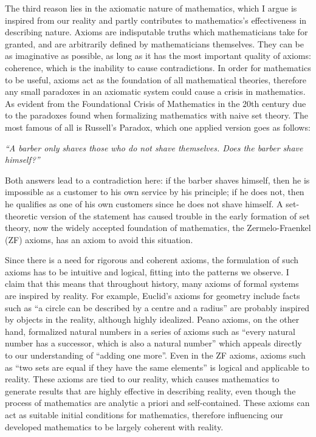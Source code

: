 \documentclass[a4paper]{article}
\newcommand{\0}{\{\}}
\newcommand{\1}{\{\0\}}
\newcommand{\2}{\{\0,\1\}}
\newcommand{\3}{\{\0,\1,\2\}}
\newcommand{\4}{\{\0,\1,\2,\3\}}
\newcommand{\5}{\{\0,\1,\2,\3,\4\}}
\begin{document}
The third reason lies in the axiomatic nature of mathematics, which I argue is
inspired from our reality and partly contributes to mathematics’s effectiveness
in describing nature. Axioms are indisputable truths which mathematicians take
for granted, and are arbitrarily defined by mathematicians themselves. They can
be as imaginative as possible, as long as it has the most important quality of
axioms: coherence, which is the inability to cause contradictions. In order for
mathematics to be useful, axioms act as the foundation of all mathematical
theories, therefore any small paradoxes in an axiomatic system could cause a
crisis in mathematics. As evident from the Foundational Crisis of Mathematics in
the 20th century due to the paradoxes found when formalizing mathematics with
naive set theory. The most famous of all is Russell’s Paradox, which one applied
version goes as follows:

\emph{“A barber only shaves those who do not shave themselves. Does the barber
  shave himself?”}

Both answers lead to a contradiction here: if the barber shaves himself, then he
is impossible as a customer to his own service by his principle; if he does not,
then he qualifies as one of his own customers since he does not shave himself. A
set-theoretic version of the statement has caused trouble in the early formation
of set theory, now the widely accepted foundation of mathematics, the
Zermelo-Fraenkel (ZF) axioms, has an axiom to avoid this situation.

Since there is a need for rigorous and coherent axioms, the formulation of such
axioms has to be intuitive and logical, fitting into the patterns we observe. I
claim that this means that throughout history, many axioms of formal systems are
inspired by reality. For example, Euclid’s axioms for geometry include facts
such as “a circle can be described by a centre and a radius” are probably
inspired by objects in the reality, although highly idealized. Peano axioms, on
the other hand, formalized natural numbers in a series of axioms such as “every
natural number has a successor, which is also a natural number” which appeals
directly to our understanding of “adding one more”. Even in the ZF axioms,
axioms such as “two sets are equal if they have the same elements” is logical
and applicable to reality. These axioms are tied to our reality, which causes
mathematics to generate results that are highly effective in describing reality,
even though the process of mathematics are analytic a priori and self-contained.
These axioms can act as suitable initial conditions for mathematics, therefore
influencing our developed mathematics to be largely coherent with reality.
\end{document}
